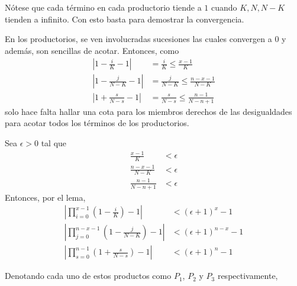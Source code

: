 \begin{Demo}
  Nótese que cada término en cada productorio tiende a $1$ cuando $K,N,N-K$
  tienden a infinito. Con esto basta para demostrar la convergencia.

  En los productorios, se ven involucradas sucesiones las cuales convergen
  a $0$ y además, son sencillas de acotar. Entonces, como
  \begin{align*}
    \left|1 - \frac{i}{K} - 1\right| &= \frac{i}{K} \leq \frac{x-1}{K}\\[10pt]
    \left|1 - \frac{j}{N-K} - 1\right| &= \frac{j}{N-K} \leq \frac{n-x-1}{N-K}\\[10pt]
    \left|1 + \frac{s}{N-s} - 1\right| &= \frac{s}{N-s} \leq \frac{n-1}{N-n+1}
  \end{align*}
  solo hace falta hallar una cota para los miembros derechos de las desigualdades para
  acotar todos los términos de los productorios.

  Sea $\epsilon>0$ tal que
  \begin{align*}
    \frac{x-1}{K}     &< \epsilon\\
    \frac{n-x-1}{N-K} &< \epsilon\\
    \frac{n-1}{N-n+1} &< \epsilon
  \end{align*}
  Entonces, por el lema,
  \begin{align*}
    \left|\prod_{i=0}^{x-1}\left(1-\frac{i}{K}\right) - 1\right| 
    &< (\epsilon + 1)^x - 1\\[10pt]
    \left|\prod_{j=0}^{n-x-1}\left(1 - \frac{j}{N-K}\right) - 1\right|
    &< (\epsilon + 1)^{n-x} - 1\\[10pt]
    \left|\prod_{s=0}^{n-1}\left(1 + \frac{s}{N-s}\right) - 1\right|
    &< (\epsilon + 1)^n - 1
  \end{align*}

  Denotando cada uno de estos productos como $P_1$, $P_2$ y $P_3$ respectivamente,


\end{Demo}
